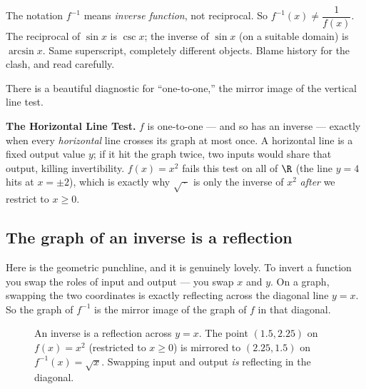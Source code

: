 \begin{trapbox}
The notation $f^{-1}$ means \emph{inverse function}, not reciprocal. So
$f^{-1}(x) \ne \dfrac{1}{f(x)}$. The reciprocal of $\sin x$ is $\csc x$; the
inverse of $\sin x$ (on a suitable domain) is $\arcsin x$. Same superscript,
completely different objects. Blame history for the clash, and read carefully.
\end{trapbox}

There is a beautiful diagnostic for ``one-to-one,'' the mirror image of the
vertical line test.

\begin{focusbox}
\textbf{The Horizontal Line Test.}\quad
$f$ is one-to-one --- and so has an inverse --- exactly when every \emph{horizontal}
line crosses its graph at most once. A horizontal line is a fixed output value $y$;
if it hit the graph twice, two inputs would share that output, killing
invertibility. $f(x)=x^2$ fails this test on all of $\R$ (the line $y=4$ hits at
$x=\pm 2$), which is exactly why $\sqrt{\,\cdot\,}$ is only the inverse of $x^2$
\emph{after} we restrict to $x \ge 0$.
\end{focusbox}

\subsection{The graph of an inverse is a reflection}

Here is the geometric punchline, and it is genuinely lovely. To invert a function
you swap the roles of input and output --- you swap $x$ and $y$. On a graph,
swapping the two coordinates is exactly reflecting across the diagonal line $y=x$.
So the graph of $f^{-1}$ is the mirror image of the graph of $f$ in that diagonal.

\begin{figure}[H]
\centering
{}
\caption{An inverse is a reflection across $y=x$. The point $(1.5,2.25)$ on
$f(x)=x^2$ (restricted to $x\ge 0$) is mirrored to $(2.25,1.5)$ on
$f^{-1}(x)=\sqrt{x}$. Swapping input and output \emph{is} reflecting in the
diagonal.}
\label{ch02:fig-inverse}
\end{figure}

